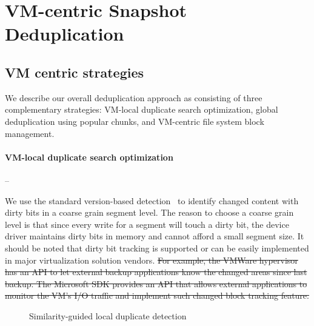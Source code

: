 \section{VM-centric Snapshot Deduplication}
\label{sect:deduplication}

\subsection{VM centric  strategies}
\label{sect:vc-strategies}

We describe our overall deduplication approach as consisting of three
complementary strategies: VM-local
duplicate search optimization, global deduplication using popular chunks, and 
VM-centric file system block management. 
\paragraph*{VM-local duplicate search optimization} --

We use the standard version-based detection~\cite{Clements2009,Vrable2009}
to identify changed content with dirty bits in a coarse grain segment level.
The reason to choose a coarse grain level is that 
since every write for a segment will touch a dirty bit, the device driver maintains dirty bits in 
memory and cannot afford a small segment size.
It should be noted that dirty bit tracking is supported or can be easily implemented in 
major virtualization solution vendors. 
\st{
For example,
the VMWare hypervisor has an API to let external backup applications know 
the changed areas since last backup. 
The Microsoft SDK provides an API that allows external applications to monitor 
the VM's I/O traffic and implement such changed block tracking feature.
}

\begin{figure}[htbp]
  \centering
  \caption{Similarity-guided local duplicate detection}
  \label{fig:local_dedup}
\end{figure}

